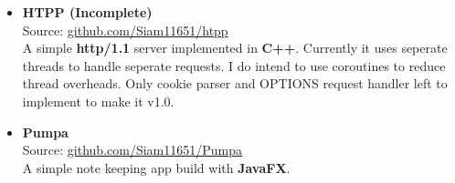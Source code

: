 \begin{itemize}
{  }
  \item {
    \textbf{HTPP (Incomplete)} \\
    Source: \href{https://github.com/Siam11651/htpp}{github.com/Siam11651/htpp} \\
    A simple \textbf{http/1.1} server implemented in \textbf{C++}. Currently it uses seperate threads to handle seperate requests. I do intend to use coroutines to reduce thread overheads. Only cookie parser and OPTIONS request handler left to implement to make it v1.0.
  }
  \item {
    \textbf{Pumpa} \\
    Source: \href{https://github.com/Siam11651/Pumpa}{github.com/Siam11651/Pumpa} \\
    A simple note keeping app build with \textbf{JavaFX}.
  }
\end{itemize}
